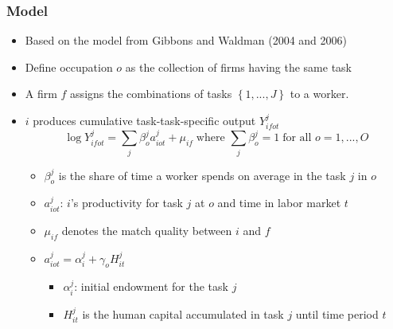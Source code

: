 \documentclass[11pt]{beamer}
\begin{document}
\begin{frame}
	\frametitle{Model}
	\begin{itemize}
		\item Based on the model from  Gibbons and Waldman {\small (2004 and 2006)}
		\item Define occupation $o$ as the collection of firms having the same task
		\item A firm $f$ assigns the combinations of tasks $\left\lbrace 1,...,J\right\rbrace $ to a worker.
		
%		
		\item $i$ produces cumulative task-task-specific output $Y_{ifot}^j$
		\begin{equation}
			\log{Y_{ifot}^j} = \sum_{j} \beta_{o}^{j} a_{iot}^j + \mu_{if} \;\text{where } \sum_{j} \beta_{o}^j = 1 \;\text{for all }o=1,...,O
		\end{equation}
		\begin{itemize}
			\item $\beta_{o}^{j} $ is the share of time a worker spends on average in the task $j$ in  $o$
			\vspace{0.8 mm}
			\item $a_{iot}^j$:  $i$'s productivity for task $j$ at  $o$ and time in labor market $t$
			\vspace{0.8 mm}
			\item $\mu_{if}$ denotes the match quality between $i$ and $f$ 
			\item $	a_{iot}^j = \alpha_{i}^j + \gamma_o H^j_{it}$
			\begin{itemize}
				\item  $\alpha_{i}^j$: initial endowment for the task $j$
				\item $H_{it}^j$ is the human capital accumulated in task $j$ until time period $t$
			\end{itemize}
		\end{itemize}
	\end{itemize}
\end{frame}
\end{document}
